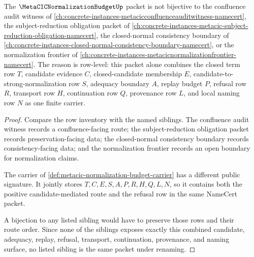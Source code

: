 \begin{theorem}
\label{thm:metacic-normalization-budget-independence-boundary}
The $\MetaCICNormalizationBudgetUp$ packet is not bijective to the confluence audit witness of \autoref{ch:concrete-instances-metacicconfluenceauditwitness-namecert}, the subject-reduction obligation packet of \autoref{ch:concrete-instances-metacic-subject-reduction-obligation-namecert}, the closed-normal consistency boundary of \autoref{ch:concrete-instances-closed-normal-consistency-boundary-namecert}, or the normalization frontier of \autoref{ch:concrete-instances-metacicnormalizationfrontier-namecert}. The reason is row-level: this packet alone combines the closed term row $T$, candidate evidence $C$, closed-candidate membership $E$, candidate-to-strong-normalization row $S$, adequacy boundary $A$, replay budget $P$, refusal row $R$, transport row $H$, continuation row $Q$, provenance row $L$, and local naming row $N$ as one finite carrier.
\end{theorem}
\begin{proof}
Compare the row inventory with the named siblings. The confluence audit witness records a confluence-facing route; the subject-reduction obligation packet records preservation-facing data; the closed-normal consistency boundary records consistency-facing data; and the normalization frontier records an open boundary for normalization claims.

The carrier of \autoref{def:metacic-normalization-budget-carrier} has a different public signature. It jointly stores $T,C,E,S,A,P,R,H,Q,L,N$, so it contains both the positive candidate-mediated route and the refusal row in the same NameCert packet.

A bijection to any listed sibling would have to preserve those rows and their route order. Since none of the siblings exposes exactly this combined candidate, adequacy, replay, refusal, transport, continuation, provenance, and naming surface, no listed sibling is the same packet under renaming.
\end{proof}



